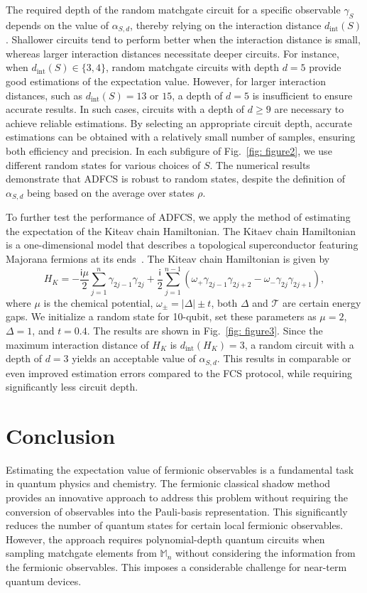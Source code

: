\documentclass[showpacs,onecolumn,aps,prx,long bibliography,superscriptaddress,notitlepage]{revtex4-1}
\newcommand{\ii}{\mathsf{i}}
\newcommand{\Tcal}{\mathcal{T}}
\newcommand{\Mbb}{\mathbb{M}}
\begin{document}
The required depth of the random matchgate circuit for a specific observable $\gamma_S$ depends on the value of $\alpha_{S,d}$, thereby relying on the interaction distance $d_\text{int}(S)$.
Shallower circuits tend to perform better when the interaction distance is small, whereas larger interaction distances necessitate deeper circuits. For instance, when $d_\text{int}(S)\in \{3,4\} $, random matchgate circuits with depth $d = 5$ provide good estimations of the expectation value. However, for larger interaction distances, such as $d_\text{int}(S) = 13$ or $15$, a depth of $d = 5$ is insufficient to ensure accurate results. In such cases, circuits with a depth of $d \geq 9$ are necessary to achieve reliable estimations. By selecting an appropriate circuit depth, accurate estimations can be obtained with a relatively small number of samples, ensuring both efficiency and precision.
In each subfigure of Fig.~\ref{fig: figure2}, we use different random states for various choices of $S$. The numerical results demonstrate that ADFCS is robust to random states, despite the definition of $\alpha_{S,d}$ being based on the average over states $\rho$.


To further test the performance of ADFCS, we apply the method of estimating the expectation of the Kiteav chain Hamiltonian. The Kitaev chain Hamiltonian is a one-dimensional model that describes a topological superconductor featuring Majorana fermions at its ends~\cite{kitaev2001unpaired}. The Kiteav chain Hamiltonian is given by
\begin{equation}
    H_K = -\frac{\ii \mu}{2} \sum_{j=1}^n \gamma_{2j-1}\gamma_{2j} + \frac{\ii}{2}\sum_{j=1}^{n-1} \left( \omega_+ \gamma_{2j-1}\gamma_{2j+2} - \omega_- \gamma_{2j}\gamma_{2j+1} \right),
\end{equation}
where $\mu$ is the chemical potential, $\omega_{ \pm}=|\Delta| \pm t$, both $\Delta$ and $\Tcal$ are certain energy gaps. We initialize a random state for 10-qubit, set these parameters as $\mu = 2 $, $\Delta = 1$, and $t=0.4$. The results are shown in Fig.~\ref{fig: figure3}. Since the maximum interaction distance of $H_K$ is $d_\text{int}(H_K) = 3$, a random circuit with a depth of $d = 3$ yields an acceptable value of $\alpha_{S,d}$. This results in comparable or even improved estimation errors compared to the FCS protocol, while requiring significantly less circuit depth.


\section{Conclusion}
Estimating the expectation value of fermionic observables is a fundamental task in quantum physics and chemistry. The fermionic classical shadow method provides an innovative approach to address this problem without requiring the conversion of observables into the Pauli-basis representation. This significantly reduces the number of quantum states for certain local fermionic observables. However, the approach requires polynomial-depth quantum circuits when sampling matchgate elements from $\Mbb_n$ without considering the information from the fermionic observables.
This imposes a considerable challenge for near-term quantum devices.
\end{document}
